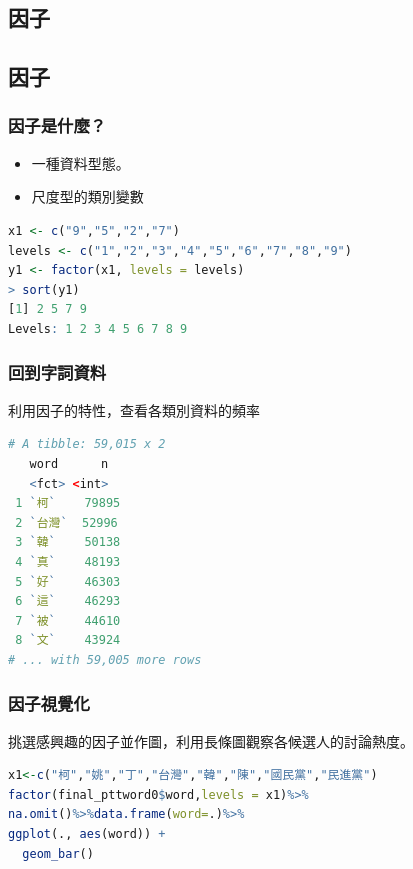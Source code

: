 \documentclass[utf8]{beamer}
\begin{document}
\begin{CJK}{UTF8}{bsmi}
\section{因子}
\subsection{因子}
\begin{frame}[fragile]
\frametitle{因子是什麼？}
\begin{itemize}
\item 一種資料型態。
\item 尺度型的類別變數
\end{itemize}
\begin{lstlisting}[language=R,identifierstyle=\color{blue},stringstyle=\color{orange},keywordstyle=\color{green!60!black}\bfseries]
x1 <- c("9","5","2","7")
levels <- c("1","2","3","4","5","6","7","8","9")
y1 <- factor(x1, levels = levels)
> sort(y1)
[1] 2 5 7 9
Levels: 1 2 3 4 5 6 7 8 9
\end{lstlisting}
\end{frame}

\begin{frame}[fragile]
\frametitle{回到字詞資料}
利用因子的特性，查看各類別資料的頻率
\begin{lstlisting}[language=R,identifierstyle=\color{blue},stringstyle=\color{orange},keywordstyle=\color{green!60!black}\bfseries]
# A tibble: 59,015 x 2
   word      n
   <fct> <int>
 1 `柯`    79895
 2 `台灣`  52996
 3 `韓`    50138
 4 `真`    48193
 5 `好`    46303
 6 `這`    46293
 7 `被`    44610
 8 `文`    43924
# ... with 59,005 more rows
\end{lstlisting}
\end{frame}

\begin{frame}[fragile]
\frametitle{因子視覺化}
挑選感興趣的因子並作圖，利用長條圖觀察各候選人的討論熱度。
\begin{lstlisting}[language=R,identifierstyle=\color{blue},stringstyle=\color{orange},keywordstyle=\color{green!60!black}\bfseries]
x1<-c("柯","姚","丁","台灣","韓","陳","國民黨","民進黨")
factor(final_pttword0$word,levels = x1)%>%
na.omit()%>%data.frame(word=.)%>%
ggplot(., aes(word)) +
  geom_bar()
\end{lstlisting}
\end{frame}


\end{CJK}
\end{document}

